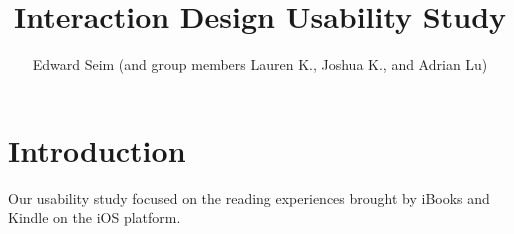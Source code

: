 \documentclass[12pt,letterpaper]{article}
\title{Interaction Design Usability Study}
\author{Edward Seim (and group members Lauren K., Joshua K., and Adrian Lu)}
\begin{document}
    \maketitle
    
    \section{Introduction}
    \label{Introduction}

    Our usability study focused on the reading experiences brought by iBooks and Kindle on the iOS platform. 
\end{document}
